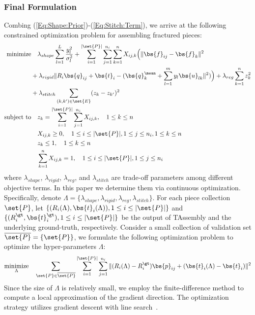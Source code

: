\subsubsection{Final Formulation}

Combing (\ref{Eq:Shape:Prior})-(\ref{Eq:Stitch:Term}), we arrive at the following constrained optimization problem for assembling fractured pieces:
\begin{align}
\textup{minimize} & \quad \lambda_{shape} \sum\limits_{l=1}^{L} \frac{y_l^2}{\sigma_l^2}+  \sum\limits_{i=1}^{|\set{P}|}\sum\limits_{j=1}^{n_i} \sum\limits_{k=1}^n X_{ij,k}\Big(\|\bs{f}_{ij}-\bs{f}_k\|^2 \nonumber \\
&+ \lambda_{rigid} \|R_i\bs{q}_{ij} + \bs{t}_i - (\bs{q}_{k}^{\mean} +  \sum\limits_{l=1}^{m}y_l\bs{u}_{lk}\|^2)\Big) + \lambda_{reg} \sum\limits_{k=1}^{n} z_k^2 \nonumber \\
&+ \lambda_{stitch} \sum\limits_{(k,k')\in \set{E}}(z_k-z_{k'})^2\nonumber \\
\textup{subject to}& \quad z_k = \sum\limits_{i=1}^{|\set{P}|}\sum\limits_{j=1}^{n_i} X_{ij,k},\quad 1\leq k \leq n \nonumber \\
& \quad X_{ij,k}\geq 0, \quad 1\leq i \leq |\set{P}|,1\leq j \leq n_i,1\leq k \leq n 
\nonumber \\
& \quad z_k \leq 1, \quad 
1\leq k \leq n
\nonumber \\
& \quad \sum\limits_{k=1}^n X_{ij,k} = 1, \quad 1\leq i \leq |\set{P}|,1\leq j \leq n_i
\label{Eq:Formulation:All}
\end{align}
where $\lambda_{shape}$, $\lambda_{rigid}$, $\lambda_{reg}$, and $\lambda_{stitch}$ are trade-off parameters among different objective terms. In this paper we determine them via continuous optimization. Specifically, denote $\Lambda = \{\lambda_{shape}, \lambda_{rigid}, \lambda_{reg}, \lambda_{stitch}\}$. For each piece collection $\set{P}$, let $\{(R_i(\Lambda),\bs{t}_i(\Lambda)),1\leq i \leq |\set{P}|\}$ and $\{(R_i^{\gt},\bs{t}_i^{\gt}),1\leq i \leq |\set{P}|\}$ be the output of TAssembly and the underlying ground-truth, respectively. Consider a small collection of validation set $\overline{\set{P}} = \{\set{P}\}$, we formulate the following optimization problem to optimize the hyper-parameters $\Lambda$:
\begin{equation}
\underset{\Lambda}{\textup{minimize}}\quad \sum\limits_{\set{P}\in \overline{\set{P}}} \sum\limits_{i=1}^{|\set{P}|} \sum\limits_{j=1}^{n_i}\|(R_i(\Lambda)-R_i^{\gt})\bs{p}_{ij} + (\bs{t}_i(\Lambda)-\bs{t}_i)\|^2
\label{Eq:Lambda:Opt}
\end{equation}
Since the size of $\Lambda$ is relatively small, we employ the finite-difference method to compute a local approximation of the gradient direction. The optimization strategy utilizes gradient descent with line search~\cite{NoceWrig06}. 
